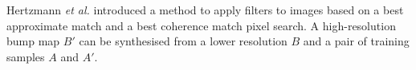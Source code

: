 \documentclass[landscape,a0paper,fontscale=0.285]{baposter} %
\begin{document}
\begin{poster}
{	Hertzmann \textit{et al.} \cite{Hertzmann:2001} introduced a method to apply filters to images based on a best approximate match and a best coherence match pixel search.
	A high-resolution bump map $B'$ can be synthesised from a lower resolution $B$ and a pair of training samples $A$ and $A'$.
}


\end{poster}
\end{document}

